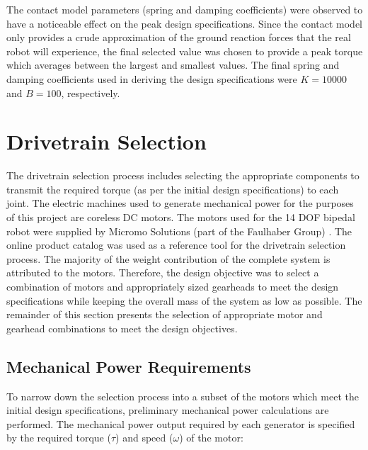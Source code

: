 The contact model parameters (spring and damping coefficients) were observed to have a noticeable effect on the peak design specifications. Since the contact model only provides a crude approximation of the ground reaction forces that the real robot will experience, the final selected value was chosen to provide a peak torque which averages between the largest and smallest values. The final spring and damping coefficients used in deriving the design specifications were $K = 10000$ and $B = 100$, respectively.




\section{Drivetrain Selection} %
\label{sec:drivetrain}
The drivetrain selection process includes selecting the appropriate components to transmit the required torque (as per the initial design specifications) to each joint. The electric machines used to generate mechanical power for the purposes of this project are coreless DC motors. The motors used for the 14 DOF bipedal robot were supplied by Micromo Solutions (part of the Faulhaber Group) \cite{sw:micromo}. The online product catalog was used as a reference tool for the drivetrain selection process. The majority of the weight contribution of the complete system is attributed to the motors. Therefore, the design objective was to select a combination of motors and appropriately sized gearheads to meet the design specifications while keeping the overall mass of the system as low as possible. The remainder of this section presents the selection of appropriate motor and gearhead combinations to meet the design objectives. 

\subsection{Mechanical Power Requirements} %
\label{sub:mechanical_power_requirements}
To narrow down the selection process into a subset of the motors which meet the initial design specifications, preliminary mechanical power calculations are performed. The mechanical power output required by each generator is specified by the required torque ($\tau$) and speed ($\omega$) of the motor: 

